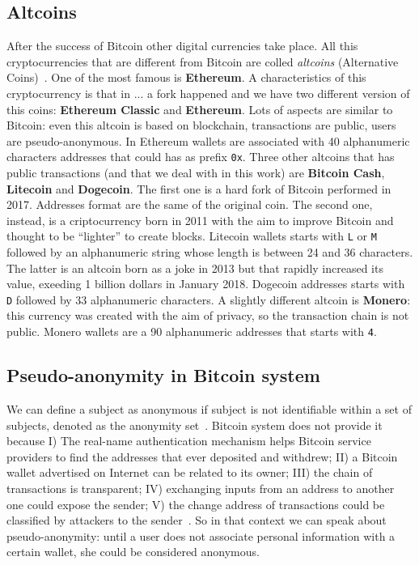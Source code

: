 \subsection{Altcoins}
After the success of Bitcoin other digital currencies take place. All this
cryptocurrencies that are different from Bitcoin are colled \textit{altcoins}
(Alternative Coins)~\cite{bitcoinbeyond}. One of the most famous is 
\textbf{Ethereum}. A characteristics of this cryptocurrency is that in ... a
fork happened and we have two different version of this coins: \textbf{Ethereum
Classic} and \textbf{Ethereum}. Lots of aspects are similar to Bitcoin: even
this altcoin is based on blockchain, transactions are public, users are
pseudo-anonymous. In Ethereum wallets are associated with 40 alphanumeric
characters addresses that could has as prefix \texttt{0x}. Three other altcoins
that has public transactions (and that we deal with in this work) are 
\textbf{Bitcoin Cash}, \textbf{Litecoin} and \textbf{Dogecoin}. The first one
is a hard fork of Bitcoin performed in 2017. Addresses format are the same of
the original coin. The second one, instead, is a criptocurrency born in 2011
with the aim to improve Bitcoin and thought to be ``lighter'' to create blocks.
Litecoin wallets starts with \texttt{L} or \texttt{M} followed by an
alphanumeric string whose length is between 24 and 36 characters. The latter
is an altcoin born as a joke in 2013 but that rapidly increased its value,
exeeding 1 billion dollars in January 2018. Dogecoin addresses starts with
\texttt{D} followed by 33 alphanumeric characters. A slightly different altcoin
is \textbf{Monero}: this currency was created with the aim of privacy, so the
transaction chain is not public. Monero wallets are a 90 alphanumeric addresses
that starts with \texttt{4}.


\subsection{Pseudo-anonymity in Bitcoin system}
We can define a subject as anonymous if subject is not identifiable within a
set of subjects, denoted as the anonymity set~\cite{terminology}. Bitcoin system
does not provide it because I) The real-name authentication mechanism
helps Bitcoin service providers to find the addresses that ever deposited and
withdrew; II) a Bitcoin wallet advertised on Internet can be related to its
owner; III) the chain of transactions is transparent; IV) exchanging inputs
from an address to another one could expose the sender; V) the change address
of transactions could be classified by attackers to the sender~\cite{deanon}.
So in that context we can speak about pseudo-anonymity: until a user does not
associate personal information with a certain wallet, she could be considered
anonymous.